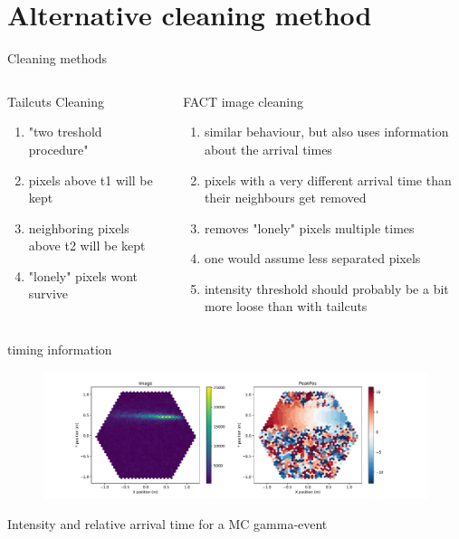 
\section{Alternative cleaning method}
\begin{frame}{Cleaning methods}
    \begin{columns}[T] %
        \begin{column}{.48\textwidth}
            Tailcuts Cleaning
            \begin{enumerate}
                \item "two treshold procedure"
                \item pixels above t1 will be kept
                \item neighboring pixels above t2 will be kept
                \item "lonely" pixels wont survive
            \end{enumerate}
        \end{column}
        \begin{column}{.48\textwidth}
            FACT image cleaning
            \begin{enumerate}
                \item similar behaviour, but also uses information about the arrival times
                \item pixels with a very different arrival time than their neighbours get removed
                \item removes "lonely" pixels multiple times
                \item one would assume less separated pixels
                \item intensity threshold should probably be a bit more loose than with tailcuts
        \end{enumerate}
        \end{column}
    \end{columns}
\end{frame}

\begin{frame}{timing information}
    \begin{figure}
        \includegraphics[width=\linewidth]{images/peakpos.pdf}
    \end{figure}
    Intensity and relative arrival time for a MC gamma-event
\end{frame}

